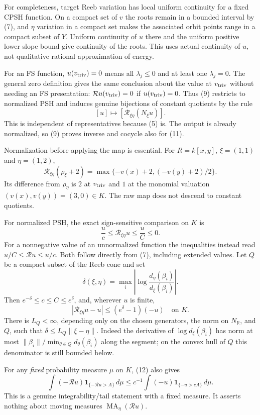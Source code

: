 \documentclass[
  11pt,
]{article}
\begin{document}
For completeness, target Reeb variation has local uniform continuity for
a fixed CPSH function. On a compact set of \(v\) the roots remain in a
bounded interval by (7), and \(\eta\) variation in a compact set makes
the associated orbit points range in a compact subset of \(Y\). Uniform
continuity of \(u\) there and the uniform positive lower slope bound
give continuity of the roots. This uses actual continuity of \(u\), not
qualitative rational approximation of energy.

For an FS function, \(u(v_{\rm triv})=0\) means all \(\lambda_j\leq0\)
and at least one \(\lambda_j=0\). The general zero definition gives the
same conclusion about the value at \(v_{\rm triv}\) without needing an
FS presentation: \(\mathcal R u(v_{\rm triv})=0\) if
\(u(v_{\rm triv})=0\). Thus (9) restricts to normalized PSH and induces
genuine bijections of constant quotients by the rule \[
 [u]\longmapsto[\mathcal R_{\xi\eta}(N_\xi u)].       \tag{11}
\] This is independent of representatives because (5) is. The output is
already normalized, so (9) proves inverse and cocycle also for (11).

Normalization before applying the map is essential. For \(R=k[x,y]\),
\(\xi=(1,1)\) and \(\eta=(1,2)\), \[
 \mathcal R_{\xi\eta}(\rho_\xi+2)
 =\max\{-v(x)+2,(-v(y)+2)/2\}.
\] Its difference from \(\rho_\eta\) is \(2\) at \(v_{\rm triv}\) and
\(1\) at the monomial valuation \((v(x),v(y))=(3,0)\in K\). The raw map
does not descend to constant quotients.

For normalized PSH, the exact sign-sensitive comparison on \(K\) is \[
 \frac{u}{c}\leq\mathcal R_{\xi\eta}u\leq\frac{u}{C}\leq0.
 \tag{12}
\] For a nonnegative value of an unnormalized function the inequalities
instead read \(u/C\leq\mathcal R u\leq u/c\). Both follow directly from
(7), including extended values. Let \(Q\) be a compact subset of the
Reeb cone and set \[
 \delta(\xi,\eta)=\max_i\left|\log
 \frac{d_\eta(\beta_i)}{d_\xi(\beta_i)}\right|.
\] Then \(e^{-\delta}\leq c\leq C\leq e^\delta\), and, wherever \(u\) is
finite, \[
 |\mathcal R_{\xi\eta}u-u|\leq(e^\delta-1)(-u)
 \quad\text{on }K.                                  \tag{13}
\] There is \(L_Q<\infty\), depending only on the chosen generators, the
norm on \(N_{\mathbb R}\), and \(Q\), such that
\(\delta\leq L_Q\|\xi-\eta\|\). Indeed the derivative of
\(\log d_\xi(\beta_i)\) has norm at most
\(\|\beta_i\|/\min_{\theta\in Q}d_\theta(\beta_i)\) along the segment;
on the convex hull of \(Q\) this denominator is still bounded below.

For any \emph{fixed} probability measure \(\mu\) on \(K\), (12) also
gives \[
 \int(-\mathcal R u)\mathbf1_{\{-\mathcal R u>A\}}\,d\mu
 \leq c^{-1}\int(-u)\mathbf1_{\{-u>cA\}}\,d\mu.       \tag{14}
\] This is a genuine integrability/tail statement with a fixed measure.
It asserts nothing about moving measures
\(\operatorname{MA}_\eta(\mathcal R u)\).
\end{document}
